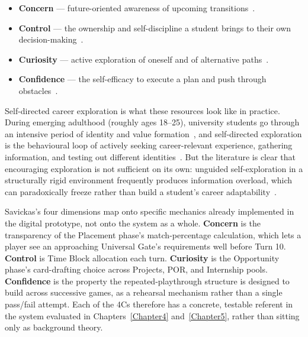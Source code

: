 \begin{itemize}
    \item \textbf{Concern} --- future-oriented awareness of upcoming transitions~\cite{Savickas-2012}.
    \item \textbf{Control} --- the ownership and self-discipline a student brings to their own decision-making~\cite{Savickas-2012}.
    \item \textbf{Curiosity} --- active exploration of oneself and of alternative paths~\cite{Savickas-2012}.
    \item \textbf{Confidence} --- the self-efficacy to execute a plan and push through obstacles~\cite{Savickas-2012}.
\end{itemize}

Self-directed career exploration is what these resources look like in practice. During emerging adulthood (roughly ages 18--25), university students go through an intensive period of identity and value formation~\cite{Arnett-2000}, and self-directed exploration is the behavioural loop of actively seeking career-relevant experience, gathering information, and testing out different identities~\cite{Taber-2015, Savickas-2012}. But the literature is clear that encouraging exploration is not sufficient on its own: unguided self-exploration in a structurally rigid environment frequently produces information overload, which can paradoxically freeze rather than build a student's career adaptability~\cite{Low-2026}.

Savickas's four dimensions map onto specific mechanics already implemented in the digital prototype, not onto the system as a whole. \textbf{Concern} is the transparency of the Placement phase's match-percentage calculation, which lets a player see an approaching Universal Gate's requirements well before Turn 10. \textbf{Control} is Time Block allocation each turn. \textbf{Curiosity} is the Opportunity phase's card-drafting choice across Projects, POR, and Internship pools. \textbf{Confidence} is the property the repeated-playthrough structure is designed to build across successive games, as a rehearsal mechanism rather than a single pass/fail attempt. Each of the 4Cs therefore has a concrete, testable referent in the system evaluated in Chapters~\ref{Chapter4} and~\ref{Chapter5}, rather than sitting only as background theory.

